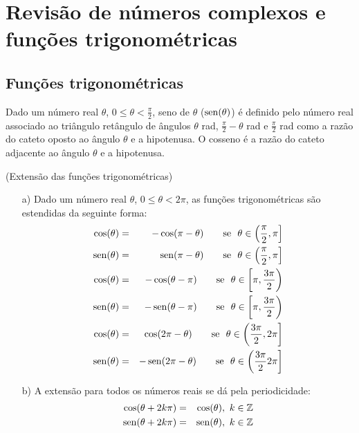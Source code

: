 \chapter{Revisão de números complexos e funções trigonométricas} %
\section{Funções trigonométricas}
\begin{defn}
Dado um número real $\theta$, $0\leq \theta<\frac{\pi}{2}$, seno de $\theta$ ($\operatorname{sen}(\theta)$) é definido pelo número real associado ao triângulo retângulo de ângulos $\theta$ rad, $\frac{\pi}{2}-\theta$ rad e $\frac{\pi}{2}$ rad como a razão do cateto oposto ao ângulo $\theta$ e a hipotenusa. O cosseno é a razão do cateto adjacente ao ângulo $\theta$ e a hipotenusa.
\end{defn}
\begin{defn}(Extensão das funções trigonométricas)
\begin{itemize}
\item[a)] Dado um número real $\theta$, $0\leq \theta<2\pi$, as funções trigonométricas são estendidas da seguinte forma:
\begin{eqnarray*}
\cos(\theta)&=&-\cos(\pi-\theta)\qquad \hbox{se }\ \theta\in \left(\frac{\pi}{2},\pi\right]\\
\operatorname{sen}(\theta)&=&\operatorname{sen}(\pi-\theta)\qquad \hbox{se }\ \theta\in \left(\frac{\pi}{2},\pi\right]\\
\cos(\theta)&=&-\cos(\theta-\pi)\qquad \hbox{se }\ \theta\in \left[\pi,\frac{3\pi}{2}\right)\\
\operatorname{sen}(\theta)&=&-\operatorname{sen}(\theta-\pi)\qquad \hbox{se }\ \theta\in \left[\pi,\frac{3\pi}{2}\right)\\
\cos(\theta)&=&\cos(2\pi-\theta)\qquad \hbox{se }\ \theta\in \left(\frac{3\pi}{2},2\pi\right]\\
\operatorname{sen}(\theta)&=&-\operatorname{sen}(2\pi-\theta)\qquad \hbox{se }\ \theta\in \left(\frac{3\pi}{2}2\pi\right]\\
\end{eqnarray*}
\item[b)] A extensão para todos os números reais se dá pela periodicidade:
\begin{eqnarray*}
\cos(\theta+2k\pi)&=&\cos(\theta),\ k\in\mathbb{Z}\\
\operatorname{sen}(\theta+2k\pi)&=&\operatorname{sen}(\theta),\ k\in\mathbb{Z}\\
\end{eqnarray*}
\end{itemize}
\end{defn}
